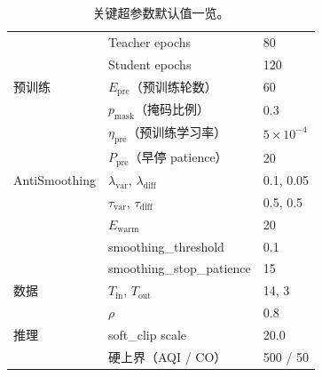 \documentclass[11pt,a4paper]{article}
\begin{document}
\begin{table}[ht]
\begin{tabular}{@{}lll@{}}
       & Teacher epochs & 80 \\
       & Student epochs & 120 \\ \midrule
预训练 & $E_{\text{pre}}$（预训练轮数） & 60 \\
       & $p_{\text{mask}}$（掩码比例） & 0.3 \\
       & $\eta_{\text{pre}}$（预训练学习率） & $5\times 10^{-4}$ \\
       & $P_{\text{pre}}$（早停 patience） & 20 \\ \midrule
AntiSmoothing & $\lambda_{\text{var}},\, \lambda_{\text{diff}}$ & 0.1, 0.05 \\
              & $\tau_{\text{var}},\, \tau_{\text{diff}}$ & 0.5, 0.5 \\
              & $E_{\text{warm}}$ & 20 \\
              & smoothing\_threshold & 0.1 \\
              & smoothing\_stop\_patience & 15 \\ \midrule
数据 & $T_{\text{in}}$, $T_{\text{out}}$ & 14, 3 \\
     & $\rho$ & 0.8 \\ \midrule
推理 & soft\_clip scale & 20.0 \\
     & 硬上界（AQI / CO） & 500 / 50 \\
\bottomrule
\end{tabular}
\caption{关键超参数默认值一览。}
\end{table}
\end{document}
